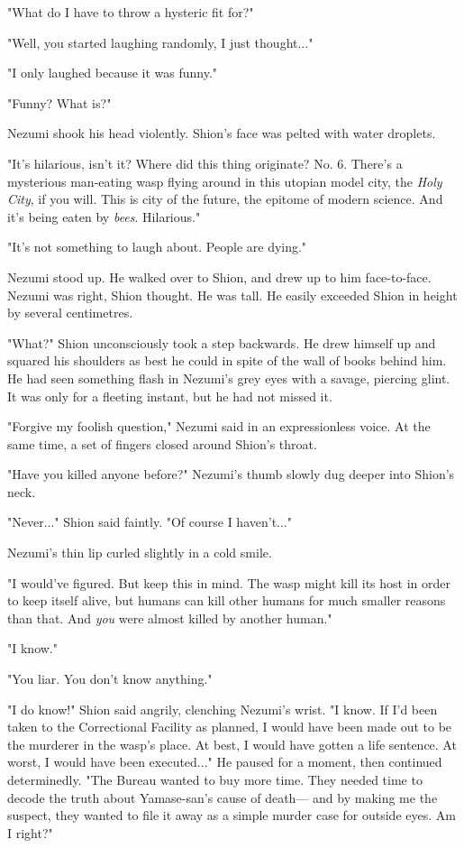 "What do I have to throw a hysteric fit for?"

"Well, you started laughing randomly, I just thought..."

"I only laughed because it was funny."

"Funny? What is?"

Nezumi shook his head violently. Shion's face was pelted with water
droplets.

"It's hilarious, isn't it? Where did this thing originate? No. 6.
There's a mysterious man-eating wasp flying around in this utopian model
city, the \emph{Holy City}, if you will. This is city of the future, the
epitome of modern science. And it's being eaten by \emph{bees}. Hilarious."

"It's not something to laugh about. People are dying."

Nezumi stood up. He walked over to Shion, and drew up to him
face-to-face. Nezumi was right, Shion thought. He was tall. He easily
exceeded Shion in height by several centimetres.

"What?" Shion unconsciously took a step backwards. He drew himself up
and squared his shoulders as best he could in spite of the wall of books
behind him. He had seen something flash in Nezumi's grey eyes with a
savage, piercing glint. It was only for a fleeting instant, but he had
not missed it.

"Forgive my foolish question," Nezumi said in an expressionless voice.
At the same time, a set of fingers closed around Shion's throat.

"Have you killed anyone before?" Nezumi's thumb slowly dug deeper into
Shion's neck.

"Never..." Shion said faintly. "Of course I haven't..."

Nezumi's thin lip curled slightly in a cold smile.

"I would've figured. But keep this in mind. The wasp might kill its host
in order to keep itself alive, but humans can kill other humans for much
smaller reasons than that. And \emph{you} were almost killed by another human."

"I know."

"You liar. You don't know anything."

"I do know!" Shion said angrily, clenching Nezumi's wrist. "I know. If
I'd been taken to the Correctional Facility as planned, I would have
been made out to be the murderer in the wasp's place. At best, I would
have gotten a life sentence. At worst, I would have been executed..." He
paused for a moment, then continued determinedly. "The Bureau wanted to
buy more time. They needed time to decode the truth about Yamase-san's
cause of death--- and by making me the suspect, they wanted to file it
away as a simple murder case for outside eyes. Am I right?"

